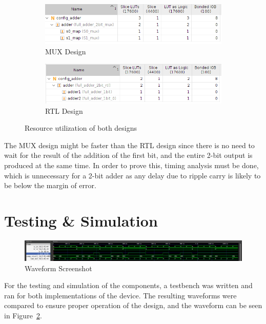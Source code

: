 \documentclass{article}
\begin{document}
\begin{figure}[h]
    \centering
    \begin{subfigure}{0.45\linewidth}
        \centering
        \includegraphics[width=\textwidth]{mux-resource.png}
        \caption{MUX Design}
    \end{subfigure}
    \begin{subfigure}{0.45\linewidth}
        \centering
        \includegraphics[width=\textwidth]{rtl-resource.png}
        \caption{RTL Design}
    \end{subfigure}
    \caption{Resource utilization of both designs}
    \label{fig:resource}
\end{figure}

The MUX design might be faster than the RTL design since there is no need to wait for the result of the addition of the first bit,
and the entire 2-bit output is produced at the same time. In order to prove this, timing analysis must be done,
which is unnecessary for a 2-bit adder as any delay due to ripple carry is likely to be below the margin of error.

\section{Testing \& Simulation}

\begin{figure}[h]
    \centering
    \includegraphics[width=\linewidth]{tb-result.png}
    \caption{Waveform Screenshot}
    \label{fig:tb-result}
\end{figure}

For the testing and simulation of the components, a testbench was written and ran for both implementations of the device.
The resulting waveforms were compared to ensure proper operation of the design, and the waveform can be seen in Figure~\ref{fig:tb-result}.
\end{document}
